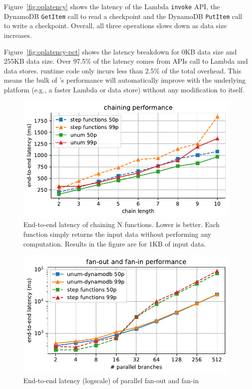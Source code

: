 Figure~\ref{fig:oplatency} shows the latency of the Lambda \texttt{invoke}
API, the DynamoDB \texttt{GetItem} call to read a checkpoint and the DynamoDB
\texttt{PutItem} call to write a checkpoint. Overall, all three operations
slows down as data size increases.

Figure~\ref{fig:oplatency-pct} shows the latency breakdown for 0KB data size
and 255KB data size. Over 97.5\% of the latency comes from APIs call to Lambda
and data stores. \name{} runtime code only incurs less than 2.5\% of the total
overhead. This means the bulk of \name{}'s performance will automatically
improve with the underlying platform (e.g., a faster Lambda or data store)
without any modification to \name{} itself.

\begin{figure}[t!]
    \centering
    \includegraphics[width=\columnwidth]{figures/ChainMicroLatency.pdf}
    \caption{End-to-end latency of chaining N functions. Lower is
    better. Each function simply returns the input data without performing any
    computation. Results in the figure are for 1KB of input data.}
    \label{fig:chainmicrolatency}
\end{figure}

\begin{figure}[t!]
    \centering
    \includegraphics[width=\columnwidth]{figures/MapMicroLatency.pdf}
    \caption{End-to-end latency (logscale) of parallel fan-out and fan-in}
    \label{fig:mapmicrolatency}
\end{figure}


